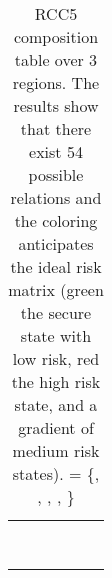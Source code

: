 \begin{table}[t]
\begin{adjustbox}{width=\textwidth}
\begin{tabular}{r||c|c|c|c|c}
	\cellcolor{abf-rg-3}&
	\cellcolor{abf-rg-4} & %
	\cellcolor{abf-rg-5}\po{$\assertionRegion$}{$\factRegion$} & %
	\cellcolor{abf-rg-6}\\ %
 & \cellcolor{abf-rg-2}\po{$\assertionRegion$}{$\factRegion$} & 
	\cellcolor{abf-rg-3}\po{$\assertionRegion$}{$\factRegion$} & 
	\cellcolor{abf-rg-4}\pp{$\assertionRegion$}{$\factRegion$} & %
	\cellcolor{abf-rg-5}\eq{$\assertionRegion$}{$\factRegion$} & %
	\cellcolor{abf-rg-6}\pp{$\assertionRegion$}{$\factRegion$} \\ %
 & \cellcolor{abf-rg-2}\pp{$\assertionRegion$}{$\factRegion$} & 
	\cellcolor{abf-rg-3}\pp{$\assertionRegion$}{$\factRegion$} & 
	\cellcolor{abf-rg-4} & %
	\cellcolor{abf-rg-5}\pp{$\assertionRegion$}{$\factRegion$} & %
	\cellcolor{abf-rg-6} \\ %
 & \cellcolor{abf-rg-2}&
 	\cellcolor{abf-rg-3} & 
	\cellcolor{abf-rg-4}& %
	\cellcolor{abf-rg-5}\ppi{$\assertionRegion$}{$\factRegion$} & %
	\cellcolor{abf-rg-6} \\ %
\hline %
 \multirow{3}{*}{\ppi{$\behaviorRegion$}{$\factRegion$}} &
 	\cellcolor{abf-rg-3}\multirow{3}{*}{} &
 	\cellcolor{abf-rg-4}\dr{$\assertionRegion$}{$\factRegion$} &
 	\cellcolor{abf-rg-5}& %
 	\cellcolor{abf-rg-6}& %
 	\cellcolor{abf-rg-7} \\ %
& \cellcolor{abf-rg-3}\dr{$\assertionRegion$}{$\factRegion$} &
 	\cellcolor{abf-rg-4}\po{$\assertionRegion$}{$\factRegion$} & 
 	\cellcolor{abf-rg-5}\all{$\assertionRegion$}{$\factRegion$}& %
 	\cellcolor{abf-rg-6}\ppi{$\assertionRegion$}{$\factRegion$}& %
 	\cellcolor{abf-rg-7}\ppi{$\assertionRegion$}{$\factRegion$}\\ %
& \cellcolor{abf-rg-3} & 
	\cellcolor{abf-rg-4}\ppi{$\assertionRegion$}{$\factRegion$} & 
	\cellcolor{abf-rg-5} & %
	\cellcolor{abf-rg-6}& %
	\cellcolor{abf-rg-7}\\ %
\hline %
	\eq{$\assertionRegion$}{$\factRegion$} & 
	\cellcolor{abf-rg-4}\dr{$\assertionRegion$}{$\factRegion$} & 
	\cellcolor{abf-rg-5} \po{$\assertionRegion$}{$\factRegion$} & 
	\cellcolor{abf-rg-6}\pp{$\assertionRegion$}{$\factRegion$} & %
	\cellcolor{abf-rg-7} \ppi{$\assertionRegion$}{$\factRegion$} & %
	\cellcolor{abfgreen} \eq{$\assertionRegion$}{$\factRegion$}  %
\end{tabular}
\end{adjustbox}
\caption{RCC5 composition table over 3 regions. The results show that there
exist 54 possible relations and the coloring anticipates the ideal risk matrix
(green the secure state with low risk, red the high risk state, and a gradient
of medium risk states). 
\all{$\assertionRegion$}{$\factRegion$} = \{\dr{$\assertionRegion$}{$\factRegion$}, \po{$\assertionRegion$}{$\factRegion$}, \pp{$\assertionRegion$}{$\factRegion$}, \ppi{$\assertionRegion$}{$\factRegion$}, \eq{$\assertionRegion$}{$\factRegion$}\}
\label{tab:5com}}
\end{table}

